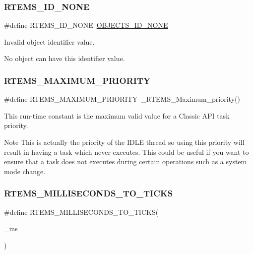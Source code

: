 \subsubsection{\texorpdfstring{RTEMS\_ID\_NONE}{RTEMS\_ID\_NONE}}
{\footnotesize\ttfamily \#define R\+T\+E\+M\+S\+\_\+\+I\+D\+\_\+\+N\+O\+NE~\mbox{\hyperlink{group__RTEMSScoreObject_ga39c027c946ce38b5a77192c60130a1de}{O\+B\+J\+E\+C\+T\+S\+\_\+\+I\+D\+\_\+\+N\+O\+NE}}}



Invalid object identifier value. 

No object can have this identifier value. \mbox{\label{group__ClassicTasks_ga5db28fd197129084aaede29389af1872}} 
\subsubsection{\texorpdfstring{RTEMS\_MAXIMUM\_PRIORITY}{RTEMS\_MAXIMUM\_PRIORITY}}
{\footnotesize\ttfamily \#define R\+T\+E\+M\+S\+\_\+\+M\+A\+X\+I\+M\+U\+M\+\_\+\+P\+R\+I\+O\+R\+I\+TY~\+\_\+\+R\+T\+E\+M\+S\+\_\+\+Maximum\+\_\+priority()}

This run-\/time constant is the maximum valid value for a Classic A\+PI task priority.

\begin{DoxyNote}{Note}
This is actually the priority of the I\+D\+LE thread so using this priority will result in having a task which never executes. This could be useful if you want to ensure that a task does not executes during certain operations such as a system mode change. 
\end{DoxyNote}
\mbox{\label{group__ClassicTasks_gad2ac8e783e2e6cd6e265a54034dbbdc4}} 
\subsubsection{\texorpdfstring{RTEMS\_MILLISECONDS\_TO\_TICKS}{RTEMS\_MILLISECONDS\_TO\_TICKS}}
{\footnotesize\ttfamily \#define R\+T\+E\+M\+S\+\_\+\+M\+I\+L\+L\+I\+S\+E\+C\+O\+N\+D\+S\+\_\+\+T\+O\+\_\+\+T\+I\+C\+KS(\begin{DoxyParamCaption}\item[{}]{\+\_\+ms }\end{DoxyParamCaption})}

